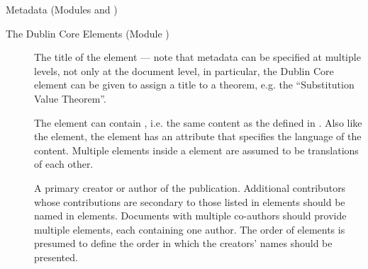 \begin{tchapter}[id=metadata,short=Metadata]{Metadata (Modules {} and  {})}
\begin{tsection}[id=dc-elements]{The Dublin Core Elements (Module {})}
\begin{description}
\item[{}] The title of the element --- note that {\omdoc}
  metadata can be specified at multiple levels, not only at the document level, in
  particular, the Dublin Core {} element can be given to assign a
  title to a theorem, e.g. the ``Substitution Value Theorem''.
  
  The {} element can contain
  {}, i.e. the same content as the {}
  defined in {}. Also like the {} element, the
  {} element has an
  {} attribute that specifies the language
  of the content. Multiple {} elements inside a
  {} element are assumed to be translations of each other.
\item[{}] A primary creator or author of the publication.
  Additional contributors whose contributions are secondary to those listed in
  {} elements should be named in
  {} elements.  Documents with multiple co-authors should
  provide multiple {} elements, each containing one author.
  The order of {} elements is presumed to define the order in
  which the creators' names should be presented.
  

\end{description}
\end{tsection}
\end{tchapter}
